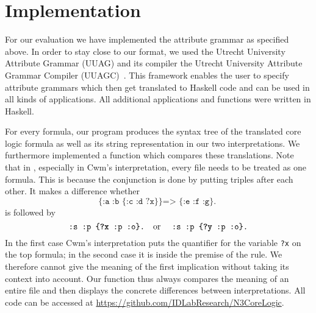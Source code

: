 \section{Implementation}\label{imp}
For our evaluation we have implemented the attribute grammar as specified above. 
In order to stay close to our format, we used the Utrecht University Attribute Grammar (UUAG) and its compiler 
the Utrecht University Attribute Grammar Compiler (UUAGC)~\cite{uuag}. This framework enables the user to specify attribute grammars which 
then get translated to Haskell code and can be used in all kinds of applications. All additional applications and functions were written in Haskell.
%
% 


For every \nthree formula, our program produces the syntax tree of the translated core logic formula as well as its string representation in our two 
interpretations.
We furthermore implemented a function which compares these translations. Note that in \nthree, 
especially in Cwm's interpretation, every file needs to be treated as one formula. This is because the conjunction is done by
putting triples after each other. It makes a difference whether 
\[
 \texttt{\{:a :b \{:c :d ?x\}\} => \{:e :f :g\}. }
\]
is followed by
\[
  \texttt{:s :p \{\textbf{?x} :p :o\}.} \text{\quad or \quad}  \texttt{:s :p \{\textbf{?y} :p :o\}.}
\]
In the first case Cwm's interpretation puts the quantifier for the variable \texttt{?x} on the top formula; in the second case it is inside the premise of the rule.
We therefore cannot give the meaning of the first implication without taking its context into account. Our function thus always 
compares the meaning of an entire file and then displays the concrete differences between interpretations. All code can be accessed at \url{https://github.com/IDLabResearch/N3CoreLogic}.



